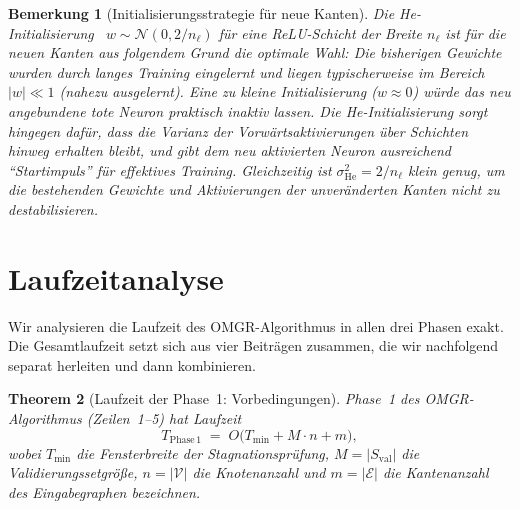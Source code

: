 ﻿\documentclass[12pt, a4paper, openany]{report}
\newtheorem{theorem}{Theorem}[chapter]
\newtheorem{remark}[theorem]{Bemerkung}
\newcommand{\calN}{\mathcal{N}}
\newcommand{\calV}{\mathcal{V}}
\newcommand{\calE}{\mathcal{E}}
\begin{document}
\begin{remark}[Initialisierungsstrategie für neue Kanten]
\label{rem:he_init}
Die He-Initialisierung~\cite{he2015delving}
$w \sim \calN(0, 2/n_\ell)$ für eine ReLU-Schicht der Breite $n_\ell$
ist für die neuen Kanten aus folgendem Grund die optimale Wahl:
Die bisherigen Gewichte wurden durch langes Training eingelernt und liegen
typischerweise im Bereich $|w| \ll 1$ (nahezu ausgelernt).  Eine zu
kleine Initialisierung ($w \approx 0$) würde das neu angebundene tote
Neuron praktisch inaktiv lassen.  Die He-Initialisierung sorgt hingegen
dafür, dass die Varianz der Vorwärtsaktivierungen über Schichten hinweg
erhalten bleibt, und gibt dem neu aktivierten Neuron ausreichend
``Startimpuls'' für effektives Training.  Gleichzeitig ist
$\sigma_{\mathrm{He}}^2 = 2/n_\ell$ klein genug, um die bestehenden
Gewichte und Aktivierungen der unveränderten Kanten nicht zu destabilisieren.
\end{remark}

\section{Laufzeitanalyse}
\label{sec:algo_runtime}

Wir analysieren die Laufzeit des OMGR-Algorithmus in allen drei Phasen
exakt.  Die Gesamtlaufzeit setzt sich aus vier Beiträgen zusammen, die
wir nachfolgend separat herleiten und dann kombinieren.

\begin{theorem}[Laufzeit der Phase~1: Vorbedingungen]
\label{thm:runtime_phase1}
Phase~1 des OMGR-Algorithmus (Zeilen~1--5) hat Laufzeit
\begin{equation}
  \label{eq:runtime_phase1}
  T_{\mathrm{Phase\,1}} \;=\; O\!\bigl(T_{\min} + M \cdot n + m\bigr),
\end{equation}
wobei $T_{\min}$ die Fensterbreite der Stagnationsprüfung,
$M = |S_{\mathrm{val}}|$ die Validierungssetgröße,
$n = |\calV|$ die Knotenanzahl und
$m = |\calE|$ die Kantenanzahl des Eingabegraphen bezeichnen.
\end{theorem}
\end{document}
